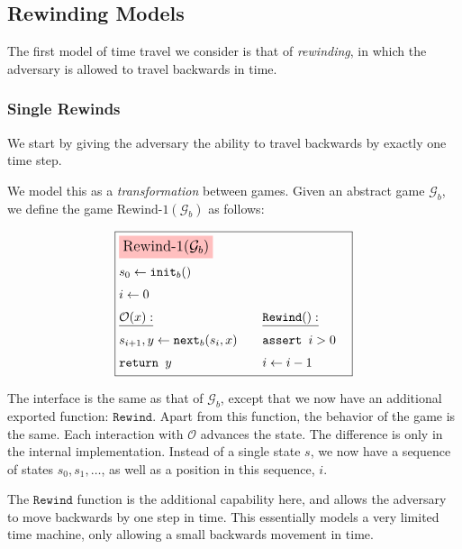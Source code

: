\subsection{Rewinding Models}

The first model of time travel we consider is that of \emph{rewinding},
in which the adversary is allowed to travel backwards in time.

\subsubsection{Single Rewinds}

We start by giving the adversary the ability to travel backwards
by exactly one time step.

We model this as a \emph{transformation} between games.
Given an abstract game $\mathcal{G}_b$, we define the game
$\text{Rewind-1}(\mathcal{G}_b)$ as follows:

\begin{game}
\captionsetup{justification=centering}
$$
\boxed{
\begin{aligned}
&\colorbox{pink}{\large $\text{Rewind-1}(\mathcal{G}_b)$}\cr
&s_0 \gets \texttt{init}_b()\cr
&i \gets 0\cr
&\begin{aligned}
    &\underline{\mathcal{O}(x):}\cr
    &s_{i + 1}, y \gets \texttt{next}_b(s_i, x)\cr
    &\texttt{return } y\cr
\end{aligned}
&\begin{aligned}
    &\underline{\texttt{Rewind}():}\cr
    &\texttt{assert } i > 0\cr
    &i \gets i - 1\cr
\end{aligned}\cr
\end{aligned}
}
$$
\caption{$\text{Rewind-1}(\mathcal{G}_b)$}
\end{game}

The interface is the same as that of $\mathcal{G}_b$, except that
we now have an additional exported function: $\texttt{Rewind}$.
Apart from this function, the behavior of the game is the same.
Each interaction with $\mathcal{O}$ advances the state.
The difference is only in the internal implementation.
Instead of a single state $s$, we now have a sequence of states
$s_0, s_1, \ldots$, as well as a position in this sequence, $i$.

The $\texttt{Rewind}$ function is the additional capability here,
and allows the adversary to move backwards by one step in time.
This essentially models a very limited time machine, only
allowing a small backwards movement in time.

